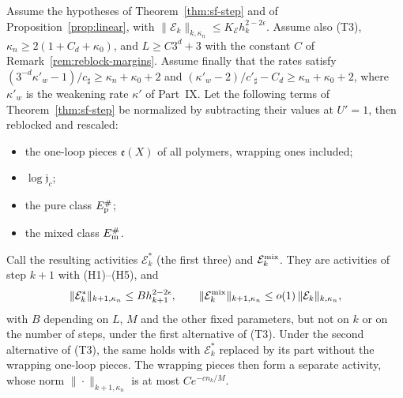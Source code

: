 \begin{proposition}[Sources]\label{prop:sources}
Assume the hypotheses of Theorem~\ref{thm:sf-step} and of Proposition~\ref{prop:linear}, with $\|\mathcal E_k\|_{k,\kappa_n}\le K_{\mathcal E}h_k^{2-2\epsilon}$. Assume also (T3), $\kappa_n\ge2(1+C_d+\kappa_0)$, and $L\ge C3^d+3$ with the constant $C$ of Remark~\ref{rem:reblock-margins}. Assume finally that the rates satisfy $(3^{-d}\kappa'_w-1)/c_\sharp\ge\kappa_n+\kappa_0+2$ and $(\kappa'_w-2)/c'_\sharp-C_d\ge\kappa_n+\kappa_0+2$, where $\kappa'_w$ is the weakening rate $\kappa'$ of Part~IX. Let the following terms of Theorem~\ref{thm:sf-step} be normalized by subtracting their values at $U'=1$, then reblocked and rescaled:
\begin{itemize}
\item the one-loop pieces $\mathfrak e(X)$ of all polymers, wrapping ones included;
\item $\log\mathfrak j_c$;
\item the pure class $E^\#_{\rm p}$;
\item the mixed class $E^\#_{\rm m}$.
\end{itemize}
Call the resulting activities $\mathcal E^*_k$ (the first three) and $\mathcal E^{\rm mix}_k$. They are activities of step $k+1$ with (H1)--(H5), and
\[
\|\mathcal E^*_k\|_{k+1,\kappa_n}\le Bh_{k+1}^{2-2\epsilon},\qquad\|\mathcal E^{\rm mix}_k\|_{k+1,\kappa_n}\le o(1)\,\|\mathcal E_k\|_{k,\kappa_n},
\]
with $B$ depending on $L$, $M$ and the other fixed parameters, but not on $k$ or on the number of steps, under the first alternative of (T3). Under the second alternative of (T3), the same holds with $\mathcal E^*_k$ replaced by its part without the wrapping one-loop pieces. The wrapping pieces then form a separate activity, whose norm $\|\cdot\|_{k+1,\kappa_n}$ is at most $Ce^{-cn_k/M}$.
\end{proposition}

